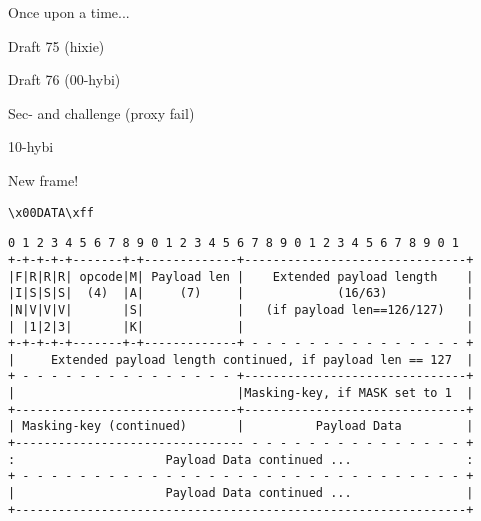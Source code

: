 \documentclass[14pt]{beamer}
\begin{document}
\begin{frame}
    \begin{center}
    Once upon a time...
    \end{center}
\end{frame}

\begin{frame}
    \begin{center}
    Draft 75 (hixie)
    \end{center}
\end{frame}

\begin{frame}
    \begin{center}
    Draft 76 (00-hybi)

    Sec- and challenge (proxy fail)
    \end{center}
\end{frame}

\begin{frame}
    \begin{center}
    10-hybi

    New frame!
    \end{center}
\end{frame}

\begin{frame}[fragile]
    \begin{verbatim}
\x00DATA\xff
    \end{verbatim}
\end{frame}

\begin{frame}[fragile]
    \small
    \begin{lstlisting}
0 1 2 3 4 5 6 7 8 9 0 1 2 3 4 5 6 7 8 9 0 1 2 3 4 5 6 7 8 9 0 1
+-+-+-+-+-------+-+-------------+-------------------------------+
|F|R|R|R| opcode|M| Payload len |    Extended payload length    |
|I|S|S|S|  (4)  |A|     (7)     |             (16/63)           |
|N|V|V|V|       |S|             |   (if payload len==126/127)   |
| |1|2|3|       |K|             |                               |
+-+-+-+-+-------+-+-------------+ - - - - - - - - - - - - - - - +
|     Extended payload length continued, if payload len == 127  |
+ - - - - - - - - - - - - - - - +-------------------------------+
|                               |Masking-key, if MASK set to 1  |
+-------------------------------+-------------------------------+
| Masking-key (continued)       |          Payload Data         |
+-------------------------------- - - - - - - - - - - - - - - - +
:                     Payload Data continued ...                :
+ - - - - - - - - - - - - - - - - - - - - - - - - - - - - - - - +
|                     Payload Data continued ...                |
+---------------------------------------------------------------+
    \end{lstlisting}
\end{frame}
\end{document}
